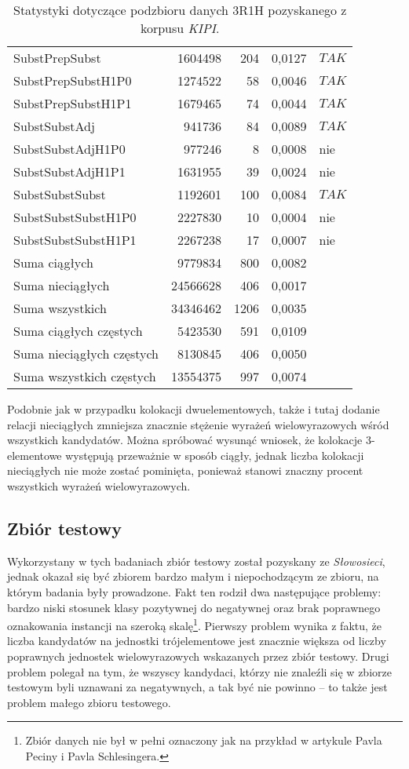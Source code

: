 \begin{table}[h!]
\begin{tabular}{ l | r | r | r | l }
	SubstPrepSubst	&	1604498	&	204	&	0,0127	&	$ TAK $	\\
	SubstPrepSubstH1P0	&	1274522	&	58	&	0,0046	&	$ TAK $	\\
	SubstPrepSubstH1P1	&	1679465	&	74	&	0,0044	&	$ TAK $	\\
	SubstSubstAdj	&	941736	&	84	&	0,0089	&	$ TAK $	\\
	SubstSubstAdjH1P0	&	977246	&	8	&	0,0008	&	nie	\\
	SubstSubstAdjH1P1	&	1631955	&	39	&	0,0024	&	nie	\\
	SubstSubstSubst	&	1192601	&	100	&	0,0084	&	$ TAK $	\\
	SubstSubstSubstH1P0	&	2227830	&	10	&	0,0004	&	nie	\\
	SubstSubstSubstH1P1	&	2267238	&	17	&	0,0007	&	nie	\\
	\midrule									
	Suma ciągłych	&	9779834	&	800	&	0,0082	&		\\
	Suma nieciągłych	&	24566628	&	406	&	0,0017	&		\\
	Suma wszystkich	&	34346462	&	1206	&	0,0035	&		\\
	Suma ciągłych częstych	&	5423530	&	591	&	0,0109	&		\\
	Suma nieciągłych częstych	&	8130845	&	406	&	0,0050	&		\\
	Suma wszystkich częstych	&	13554375	&	997	&	0,0074	&		\\
\bottomrule									
\end{tabular}
\caption[Statystyki podzbioru danych \emph{KIPI} 3R1H]{Statystyki dotyczące podzbioru danych 3R1H pozyskanego z korpusu \emph{KIPI}.}
\label{KIPI_3R1H_stats}
\end{table}

Podobnie jak w przypadku kolokacji dwuelementowych, także i tutaj dodanie relacji nieciągłych zmniejsza znacznie stężenie wyrażeń wielowyrazowych wśród wszystkich kandydatów.
Można spróbować wysunąć wniosek, że kolokacje 3-elementowe występują przeważnie w sposób ciągły, jednak liczba kolokacji nieciągłych nie może zostać pominięta, ponieważ stanowi znaczny procent wszystkich wyrażeń wielowyrazowych.


\subsection{Zbiór testowy}
Wykorzystany w tych badaniach zbiór testowy został pozyskany ze \emph{Słowosieci}, jednak okazał się być zbiorem bardzo małym i niepochodzącym ze zbioru, na którym badania były prowadzone.
Fakt ten rodził dwa następujące problemy: bardzo niski stosunek klasy pozytywnej do negatywnej oraz brak poprawnego oznakowania instancji na szeroką skalę\footnote{Zbiór danych nie był w pełni oznaczony jak na przykład w artykule Pavla Peciny i Pavla Schlesingera.}.
Pierwszy problem wynika z faktu, że liczba kandydatów na jednostki trójelementowe jest znacznie większa od liczby poprawnych jednostek wielowyrazowych wskazanych przez zbiór testowy.
Drugi problem polegał na tym, że wszyscy kandydaci, którzy nie znaleźli się w zbiorze testowym byli uznawani za negatywnych, a tak być nie powinno -- to także jest problem małego zbioru testowego.

